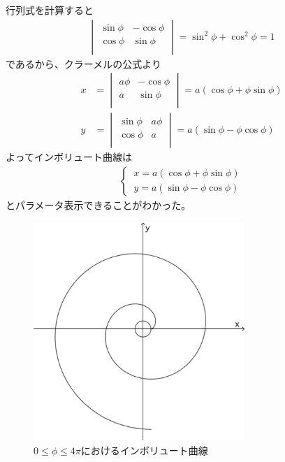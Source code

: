 行列式を計算すると
\begin{align*}
  \begin{vmatrix}
    \sin\phi & -\cos\phi \\
    \cos\phi & \sin\phi \\
  \end{vmatrix}
  =\sin^2\phi + \cos^2\phi = 1
\end{align*}
であるから、クラーメルの公式より
  \begin{align*}
    x &=
    \begin{vmatrix}
      a\phi & -\cos\phi \\
      a & \sin\phi \\
    \end{vmatrix}
    = a(\cos\phi + \phi\sin\phi)\\
    y &=
    \begin{vmatrix}
      \sin\phi & a\phi \\
      \cos\phi & a \\
    \end{vmatrix}
    = a(\sin\phi - \phi\cos\phi)
  \end{align*}
よってインボリュート曲線は
\begin{align*}
  \begin{cases}
  \,x = a(\cos\phi + \phi\sin\phi)\\
  \,y = a(\sin\phi - \phi\cos\phi)
  \end{cases}
\end{align*}
とパラメータ表示できることがわかった。

\begin{figure}[H]
  \centering
  \includegraphics[width=8cm]{nakayama1/image/imbo2}\\
  $0 \le \phi \le 4\pi$におけるインボリュート曲線
\end{figure}

